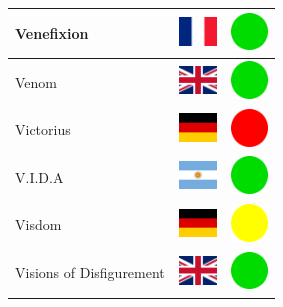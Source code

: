 \documentclass[12pt, a4paper, twoside]{report}
\begin{document}
\begin{center}
\begin{longtable}{|p{5cm}|p{2cm}|p{2cm}|}
			Venefixion & \includegraphics[width=1cm]{4x3/fr} & \includegraphics[width=1cm]{likes/y} \\ \hline
			Venom & \includegraphics[width=1cm]{4x3/gb} & \includegraphics[width=1cm]{likes/y} \\ \hline
			Victorius & \includegraphics[width=1cm]{4x3/de} & \includegraphics[width=1cm]{likes/n} \\ \hline
			V.I.D.A & \includegraphics[width=1cm]{4x3/ar} & \includegraphics[width=1cm]{likes/y} \\ \hline
			Visdom & \includegraphics[width=1cm]{4x3/de} & \includegraphics[width=1cm]{likes/m} \\ \hline
			Visions of Disfigurement & \includegraphics[width=1cm]{4x3/gb} & \includegraphics[width=1cm]{likes/y} \\ \hline

\end{longtable}
\end{center}
\end{document}
